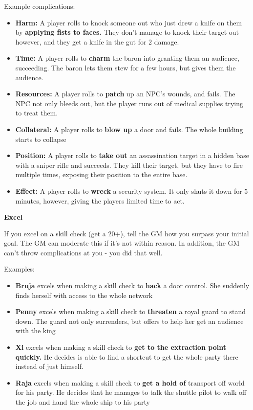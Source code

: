 Example complications:
\begin{itemize}
\item \textbf{Harm:} A player rolls to knock someone out who just drew a knife on them by \textbf{applying fists to faces.} They don't manage to knock their target out however, and they get a knife in the gut for 2 damage.
\item \textbf{Time:} A player rolls to \textbf{charm} the baron into granting them an audience, succeeding. The baron lets them stew for a few hours, but gives them the audience.
\item \textbf{Resources:} A player rolls to \textbf{patch} up an NPC's wounds, and fails. The NPC not only bleeds out, but the player runs out of medical supplies trying to treat them.
\item \textbf{Collateral:} A player rolls to \textbf{blow up} a door and fails. The whole building starts to collapse
\item \textbf{Position:} A player rolls to \textbf{take out} an assassination target in a hidden base with a sniper rifle and succeeds. They kill their target, but they have to fire multiple times, exposing their position to the entire base.
\item \textbf{Effect:} A player rolls to \textbf{wreck} a security system. It only shuts it down for 5 minutes, however, giving the players limited time to act.
\end{itemize}  

\begin{center}
\textbf{Excel}
\end{center}

If you excel on a skill check (get a 20+), tell the GM how you surpass your initial goal. The GM can moderate this if it's not within reason. In addition, the GM can't throw complications at you - you did that well. 

Examples:
\begin{itemize}
\item \textbf{Bruja} excels when making a skill check to \textbf{hack} a door control. She suddenly finds herself with access to the whole network
\item \textbf{Penny} excels when making a skill check to \textbf{threaten} a royal guard to stand down. The guard not only surrenders, but offers to help her get an audience with the king
\item \textbf{Xi} excels when making a skill check to \textbf{get to the extraction point quickly.} He decides is able to find a shortcut to get the whole party there instead of just himself.
\item \textbf{Raja} excels when making a skill check to \textbf{get a hold of} transport off world for his party. He decides that he manages to talk the shuttle pilot to walk off the job and hand the whole ship to his party
\end{itemize}  

